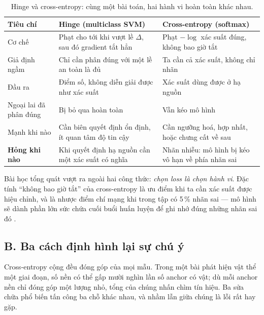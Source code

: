 \documentclass[../../deep_learning.tex]{subfiles}
\begin{document}
\begin{table}[H]\centering\small
\caption{Hinge và cross-entropy: cùng một bài toán, hai hành vi hoàn toàn khác nhau.}
\label{tab:hinge-ce}
\begin{tabularx}{\linewidth}{@{}L{2.4cm}YY@{}}
\toprule
\textbf{Tiêu chí} & \textbf{Hinge (multiclass SVM)} & \textbf{Cross-entropy (softmax)}\\
\midrule
Cơ chế & Phạt cho tới khi vượt lề \(\Delta\), sau đó gradient tắt hẳn & Phạt \(-\log\) xác suất đúng, không bao giờ tắt\\
Giả định ngầm & Chỉ cần phân đúng với một lề an toàn là đủ & Ta cần cả xác suất, không chỉ nhãn\\
Đầu ra & Điểm số, không diễn giải được như xác suất & Xác suất dùng được ở hạ nguồn\\
Ngoại lai đã phân đúng & Bị bỏ qua hoàn toàn & Vẫn kéo mô hình\\
Mạnh khi nào & Cần biên quyết định ổn định, ít quan tâm độ tin cậy & Cần ngưỡng hoá, hợp nhất, hoặc chưng cất về sau\\
\textbf{Hỏng khi nào} & Khi quyết định hạ nguồn cần một xác suất có nghĩa & Nhãn nhiễu: mô hình bị kéo vô hạn về phía nhãn sai\\
\bottomrule
\end{tabularx}
\end{table}

Bài học tổng quát vượt ra ngoài hai công thức: \emph{chọn loss là chọn hành vi}. Đặc tính ``không bao giờ tắt'' của cross-entropy là ưu điểm khi ta cần xác suất được hiệu chỉnh, và là nhược điểm chí mạng khi trong tập có 5\,\% nhãn sai --- mô hình sẽ dành phần lớn sức chứa cuối buổi huấn luyện để ghi nhớ đúng những nhãn sai đó \cite{northcutt2021pervasive}.

\subsection{B. Ba cách định hình lại sự chú ý}

Cross-entropy cộng đều đóng góp của mọi mẫu. Trong một bài phát hiện vật thể một giai đoạn, số  nền có thể gấp mười nghìn lần số anchor có vật; dù mỗi anchor nền chỉ đóng góp một lượng nhỏ, tổng của chúng nhấn chìm tín hiệu. Ba sửa chữa phổ biến tấn công ba chỗ khác nhau, và nhầm lẫn giữa chúng là lỗi rất hay gặp.
\end{document}
